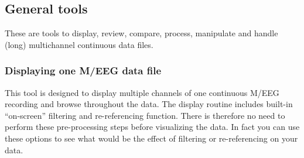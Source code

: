 \documentclass[a4paper,titlepage]{article}
\begin{document}
\subsection{General tools}
\label{sec:GeneralTools}

These are tools to display, review, compare, process, manipulate and handle (long) multichannel continuous data files.

\subsubsection{Displaying one M/EEG data file}
\label{sec:dis_main}
This tool is designed to display multiple channels of one continuous M/EEG recording and browse throughout the data. The display routine includes built-in ``on-screen'' filtering and %
 re-referencing function. There is therefore no need to perform these pre-processing steps before visualizing the data. In fact you can use these options to see what would be the effect of filtering or re-referencing on your data.
\end{document}
